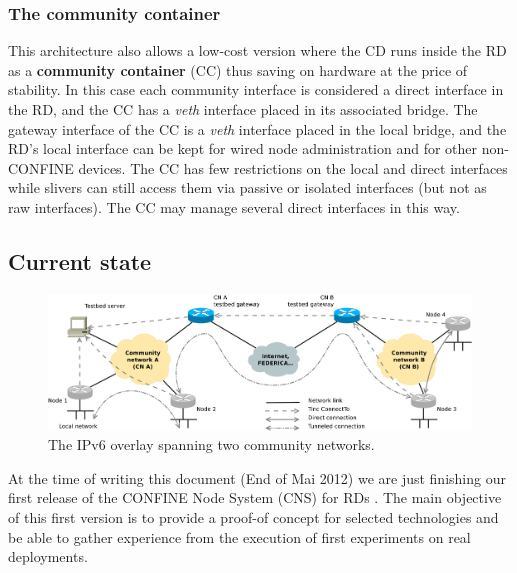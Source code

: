\documentclass[conference]{IEEEtran}
\begin{document}

\subsubsection{The community container}

This architecture also allows a low-cost version where the CD runs inside the
RD as a \textbf{community container} (CC) thus saving on hardware at the price
of stability.  In this case each community interface is considered a direct
interface in the RD, and the CC has a \emph{veth} interface placed in its
associated bridge.  The gateway interface of the CC is a \emph{veth} interface
placed in the local bridge, and the RD's local interface can be kept for wired
node administration and for other non-CONFINE devices.  The CC has few
restrictions on the local and direct interfaces while slivers can still access
them via passive or isolated interfaces (but not as raw interfaces).  The CC
may manage several direct interfaces in this way.

\subsection{Current state}

\begin{figure}[!t]
\centering
\includegraphics[height=0.20\textheight]{ipv6-overlay}
\caption{The IPv6 overlay spanning two community networks.}
\label{fig:ipv6-overlay}
\end{figure}






At the time of writing this document (End of Mai 2012) we are just
finishing our first release of the CONFINE Node System (CNS) for RDs
\cite{a-hack}. The main objective of this first version is to provide
a proof-of concept for selected technologies and be able to gather
experience from the execution of first experiments on real
deployments.
\end{document}
